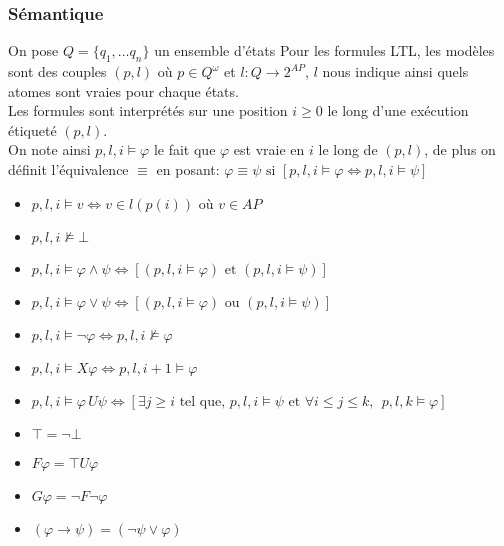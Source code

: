 \documentclass[12pt,a4paper]{article}
\theoremstyle{plain}
\theoremstyle{definition}
\begin{document}
\subsubsection{Sémantique}
On pose $Q=\{q_1, \dots q_n\}$ un ensemble d'états  Pour les formules LTL, les modèles sont des couples $(p, l)$ où $p \in Q^\omega$ et $l : Q \to 2^{AP}$, $l$ nous indique ainsi quels atomes sont vraies  pour chaque états. \\
Les formules sont interprétés sur une position $i \geq 0$ le long d'une exécution étiqueté $(p, l)$. \\
On note ainsi $p, l, i \models \varphi$ le fait que $\varphi$ est vraie en $i$ le long de $(p, l)$, de plus on définit l'équivalence $\equiv$ en posant: $\varphi \equiv \psi \textrm{ si } [p,l,i \models \varphi \Leftrightarrow p,l,i \models \psi]$
\begin{itemize}
	\item[] $p, l, i \models v \Leftrightarrow v \in l(p(i))$ où $v \in AP$
	\item[] $p,l,i \not \models \bot$
	\item[] $p, l, i \models \varphi \land \psi \Leftrightarrow [(p,l,i \models \varphi) \textrm{ et } (p,l,i \models \psi)]$
	\item[] $p,l,i \models \varphi \lor \psi \Leftrightarrow [(p,l,i \models \varphi)\textrm{ ou } (p,l,i \models \psi)]$
	\item[] $p,l,i \models \lnot \varphi \Leftrightarrow p,l,i \not \models \varphi$
	\item[] $p,l,i \models X\varphi \Leftrightarrow p,l,i+1 \models \varphi$
	\item[] $p,l,i \models \varphi\, U \psi \Leftrightarrow [\exists j \geq i\textrm{ tel que, } p,l,i \models \psi \textrm{ et } \forall i \leq j \leq k, \:\: p,l,k\models \varphi]$
	\item[] $\top = \lnot \bot$
	\item[] $F\varphi = \top U \varphi$
	\item[] $G\varphi = \lnot F \lnot \varphi$
	\item[] $(\varphi \to \psi) = (\lnot \psi \lor \varphi)$
\end{itemize}
\end{document}

